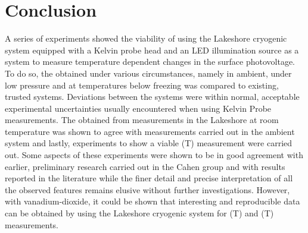 \section{Conclusion}
A series of experiments showed the viability of using the Lakeshore cryogenic system equipped with a \McA{} Kelvin probe head and an LED illumination source as a system to measure temperature dependent changes in the surface photovoltage. To do so, the \cpd{} obtained under various circumstances, namely in ambient, under low pressure and at temperatures below freezing was compared to existing, trusted systems. Deviations between the systems were within normal, acceptable experimental uncertainties usually encountered when using Kelvin Probe measurements. The \spv{} obtained from measurements in the Lakeshore at room temperature was shown to agree with \spv{} measurements carried out in the ambient system and lastly, experiments to show a viable \spv{}(T) measurement were carried out. Some aspects of these experiments were shown to be in good agreement with earlier, preliminary research carried out in the Cahen group and with results reported in the literature while the finer detail and precise interpretation of all the observed features remains elusive without further investigations. However, with vanadium-dioxide, it could be shown that interesting and reproducible data can be obtained by using the Lakeshore cryogenic system for \cpd{}(T) and \spv{}(T) measurements.


